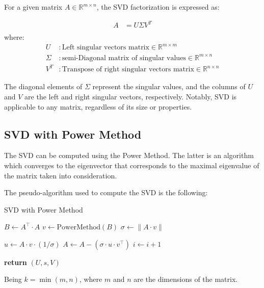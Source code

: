 \documentclass{article}
\begin{document}
For a given matrix \( A \in \mathbb{R}^{m \times n} \), the SVD factorization is expressed as:

\begin{align}
    A & = U \Sigma V^T \\
\end{align}
where:
\begin{align}
    U & : \text{Left singular vectors matrix} \in \mathbb{R}^{m \times m} \\
    \Sigma & : \text{semi-Diagonal matrix of singular values} \in \mathbb{R}^{m \times n} \\
    V^T & : \text{Transpose of right singular vectors matrix} \in \mathbb{R}^{n \times n}
\end{align}

The diagonal elements of $\Sigma$ represent the singular values, and the columns of $U$ and $V$ are the left and right singular vectors, respectively. Notably, SVD is applicable to any matrix, regardless of its size or properties.


\subsection{SVD with Power Method}
The SVD can be computed using the Power Method. The latter is an algorithm which converges to the eigenvector that corresponds to the maximal eigenvalue of the matrix taken into consideration.

\vspace{\baselineskip}
    The pseudo-algorithm used to compute the SVD is the following:

\begin{algorithm}
\caption{SVD with Power Method}
\begin{algorithmic}[3]

        \State $B \gets A^\top \cdot A$
        \State $v \gets \text{PowerMethod}(B)$
        \State $\sigma \gets \lVert A \cdot v \rVert$

        \If{$\sigma > \epsilon$}
            \State $u \gets A \cdot v \cdot (1 / \sigma)$
            \State $A \gets A - (\sigma \cdot u \cdot v^\top)$
            \State $i \gets i + 1$
        \EndIf
    \EndWhile

    \State \textbf{return} $(U, s, V)$
\EndFunction
\end{algorithmic}
\end{algorithm}

Being \( k = \min(m, n) \), where \( m \) and \( n \) are the dimensions of the matrix.
\end{document}
